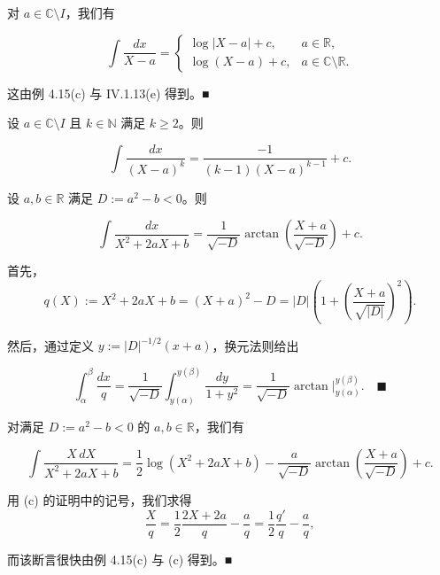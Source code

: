 \begin{example}

\begin{items}
\item

对 $ a \in \mathbb{C} \setminus I $，我们有

\begin{equation*}
\int \frac{dx}{X - a} = \begin{cases} \log |X - a| + c , & a \in \mathbb{R} , \\ \log(X - a) + c , & a \in \mathbb{C} \setminus \mathbb{R} . \end{cases}
\end{equation*}

\proofhead
这由例 4.15(c) 与 IV.1.13(e) 得到。\nobreak\hspace{0.35em}■
\item

设 $ a \in \mathbb{C} \setminus I $ 且 $ k \in \mathbb{N} $ 满足 $ k \ge 2 $。则

\[
\int \frac{dx}{(X - a)^k} = \frac{-1}{(k-1)(X - a)^{k-1}} + c .
\]
\item

设 $ a, b \in \mathbb{R} $ 满足 $ D := a^2 - b < 0 $。则

\[
\int \frac{dx}{X^2 + 2aX + b} = \frac{1}{\sqrt{-D}} \arctan\left( \frac{X + a}{\sqrt{-D}} \right) + c .
\]

\proofhead
首先，
\[
q(X) := X^2 + 2aX + b = (X + a)^2 - D = |D| \left( 1 + \left( \frac{X + a}{\sqrt{|D|}} \right)^2 \right) .
\]

然后，通过定义 $ y := |D|^{-1/2}(x + a) $，换元法则给出

\[
\int_{\alpha}^{\beta} \frac{dx}{q} = \frac{1}{\sqrt{-D}} \int_{y(\alpha)}^{y(\beta)} \frac{dy}{1 + y^2} = \frac{1}{\sqrt{-D}} \arctan \big|_{y(\alpha)}^{y(\beta)} .\quad\blacksquare
\]
\item

对满足 $ D := a^2 - b < 0 $ 的 $ a, b \in \mathbb{R} $，我们有

\[
\int \frac{X \, dX}{X^2 + 2aX + b} = \frac{1}{2} \log(X^2 + 2aX + b) - \frac{a}{\sqrt{-D}} \arctan\left( \frac{X + a}{\sqrt{-D}} \right) + c .
\]

\proofhead
用 (c) 的证明中的记号，我们求得
\[
\frac{X}{q} = \frac{1}{2} \frac{2X + 2a}{q} - \frac{a}{q} = \frac{1}{2} \frac{q'}{q} - \frac{a}{q} ,
\]

而该断言很快由例 4.15(c) 与 (c) 得到。\nobreak\hspace{0.35em}■


\end{items}
\end{example}
